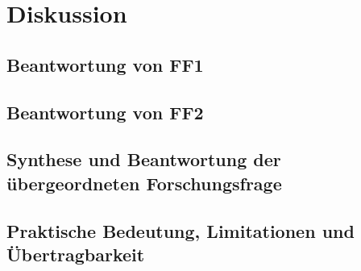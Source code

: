 \section{Diskussion}\label{sec:diskussion}

\subsection{Beantwortung von FF1}\label{sec:diskussion-ff1}

\subsection{Beantwortung von FF2}\label{sec:diskussion-ff2}

\subsection{Synthese und Beantwortung der übergeordneten Forschungsfrage}\label{sec:diskussion-synthese}

\subsection{Praktische Bedeutung, Limitationen und Übertragbarkeit}\label{sec:diskussion-limitationen}
